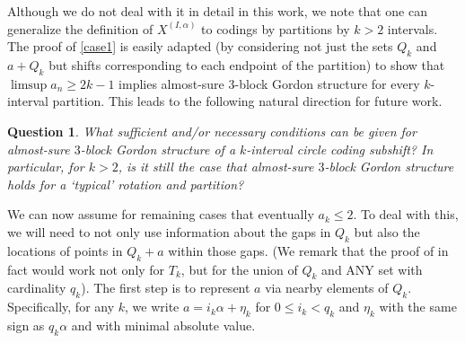 \documentclass[11pt,reqno]{amsart}
\newtheorem{question}[theorem]{Question}
\theoremstyle{definition}
\theoremstyle{plain}
\begin{document}
Although we do not deal with it in detail in this work, we note that one can generalize the definition of
$X^{(I,\alpha)}$ to codings by partitions by $k > 2$ intervals. The proof of \cref{case1} is easily adapted
(by considering not just the sets $Q_k$ and $a + Q_k$ but shifts corresponding to each endpoint of the partition) to show that $\limsup a_n \geq 2k-1$ implies almost-sure $3$-block Gordon structure for every $k$-interval partition. This leads to the following natural direction for future work.



\begin{question}
What sufficient and/or necessary conditions can be given for almost-sure $3$-block Gordon structure of a $k$-interval circle coding subshift? In particular, for $k > 2$, is it still the case that almost-sure $3$-block Gordon structure holds for a `typical' rotation and partition?
\end{question}

We can now assume for remaining cases that eventually $a_k \leq 2$. To deal with this, we will need to not only use information about the gaps in $Q_k$ but also the locations of points in $Q_k + a$ within those gaps. (We remark that the proof of  in fact would work not only for $T_k$, but for the union of $Q_k$ and ANY set with cardinality $q_k$).
The first step is to represent $a$ via nearby elements of $Q_k$. Specifically, for any $k$, we write $a = i_k \alpha + \eta_k$ for $0 \leq i_k < q_k$ and $\eta_k$ with the same sign as $q_k \alpha$ and with minimal absolute value. %
\end{document}
